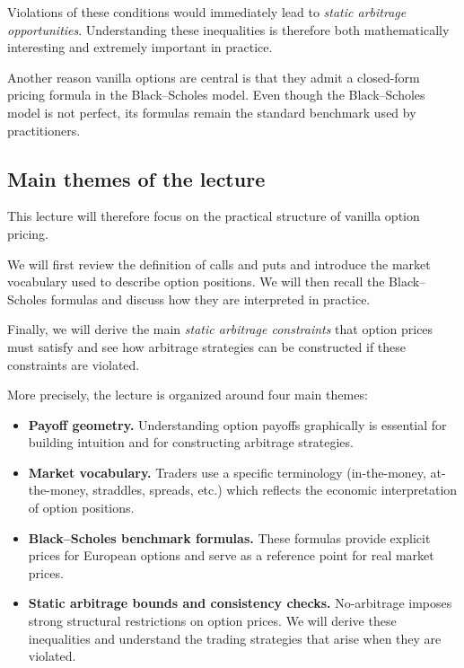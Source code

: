 \documentclass[11pt]{article}
\newcommand{\1}{\mathbf{1}}
\theoremstyle{plain}
\theoremstyle{definition}
\theoremstyle{remark}
\begin{document}
Violations of these conditions would immediately lead to
\emph{static arbitrage opportunities}.
Understanding these inequalities is therefore both mathematically
interesting and extremely important in practice.

Another reason vanilla options are central is that they admit a
closed-form pricing formula in the Black--Scholes model.
Even though the Black--Scholes model is not perfect,
its formulas remain the standard benchmark used by practitioners.

\subsection{Main themes of the lecture}

This lecture will therefore focus on the practical structure of vanilla option pricing.

We will first review the definition of calls and puts and introduce the
market vocabulary used to describe option positions.
We will then recall the Black--Scholes formulas and discuss how they are
interpreted in practice.

Finally, we will derive the main \emph{static arbitrage constraints}
that option prices must satisfy and see how arbitrage strategies can be
constructed if these constraints are violated.

More precisely, the lecture is organized around four main themes:

\begin{itemize}[leftmargin=1.4em]
    \item \textbf{Payoff geometry.}  
    Understanding option payoffs graphically is essential for building intuition
    and for constructing arbitrage strategies.

    \item \textbf{Market vocabulary.}  
    Traders use a specific terminology (in-the-money, at-the-money,
    straddles, spreads, etc.) which reflects the economic interpretation
    of option positions.

    \item \textbf{Black--Scholes benchmark formulas.}  
    These formulas provide explicit prices for European options
    and serve as a reference point for real market prices.

    \item \textbf{Static arbitrage bounds and consistency checks.}  
    No-arbitrage imposes strong structural restrictions on option prices.
    We will derive these inequalities and understand the trading
    strategies that arise when they are violated.
\end{itemize}
\end{document}

